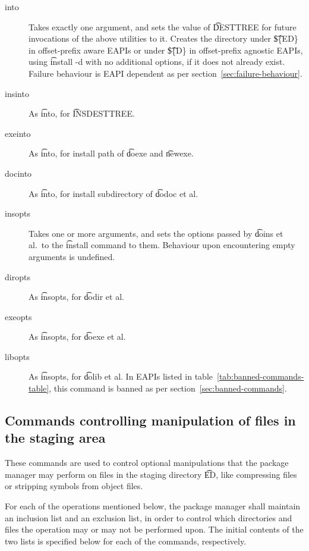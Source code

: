 \begin{description}

\item[into] Takes exactly one argument, and sets the value of \t{DESTTREE} for future invocations
    of the above utilities to it. Creates the directory under \t{\$\{ED\}} in offset-prefix aware
    EAPIs or under \t{\$\{D\}} in offset-prefix agnostic EAPIs, using \t{install -d} with no
    additional options, if it does not already exist. Failure behaviour is EAPI dependent as per
    section~\ref{sec:failure-behaviour}.

\item[insinto] As \t{into}, for \t{INSDESTTREE}.

\item[exeinto] As \t{into}, for install path of \t{doexe} and \t{newexe}.

\item[docinto] As \t{into}, for install subdirectory of \t{dodoc} et al.

\item[insopts] Takes one or more arguments, and sets the options passed by \t{doins} et al.\
    to the \t{install} command to them. Behaviour upon encountering empty arguments is undefined.

\item[diropts] As \t{insopts}, for \t{dodir} et al.

\item[exeopts] As \t{insopts}, for \t{doexe} et al.

\item[libopts] As \t{insopts}, for \t{dolib} et al.
    In EAPIs listed in table~\ref{tab:banned-commands-table}, this command is banned as
    per section~\ref{sec:banned-commands}.

\end{description}

\subsection{Commands controlling manipulation of files in the staging area}
These commands are used to control optional manipulations that the package manager may perform on
files in the staging directory \t{ED}, like compressing files or stripping symbols from object
files.

For each of the operations mentioned below, the package manager shall maintain an inclusion list
and an exclusion list, in order to control which directories and files the operation may or may not
be performed upon. The initial contents of the two lists is specified below for each of the
commands, respectively.

